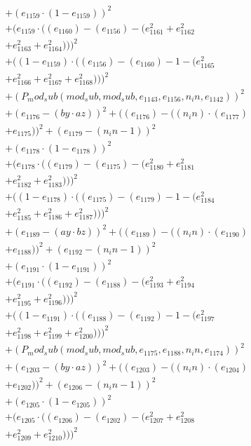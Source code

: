 \documentclass[10pt, a4paper]{article}
\begin{document}
\begin{small}
\begin{align*}
& + (e_{1159}  \cdot  (1 - e_{1159}))^{2} \\
& + (e_{1159}  \cdot  ((e_{1160}) - (e_{1156}) - (e_{1161}^{2} + e_{1162}^{2} \\
& + e_{1163}^{2} + e_{1164}^{2})))^{2} \\
& + ((1 - e_{1159})  \cdot  ((e_{1156}) - (e_{1160}) - 1 - (e_{1165}^{2} \\
& + e_{1166}^{2} + e_{1167}^{2} + e_{1168}^{2})))^{2} \\
& + (P_mod_sub(mod_sub, mod_sub, e_{1143}, e_{1156}, n_in, e_{1142}))^{2} \\
& + (e_{1176} - (by  \cdot  az))^{2} + ((e_{1176}) - ((n_in)  \cdot  (e_{1177}) \\
& + e_{1175}))^{2} + (e_{1179} - (n_in - 1))^{2} \\
& + (e_{1178}  \cdot  (1 - e_{1178}))^{2} \\
& + (e_{1178}  \cdot  ((e_{1179}) - (e_{1175}) - (e_{1180}^{2} + e_{1181}^{2} \\
& + e_{1182}^{2} + e_{1183}^{2})))^{2} \\
& + ((1 - e_{1178})  \cdot  ((e_{1175}) - (e_{1179}) - 1 - (e_{1184}^{2} \\
& + e_{1185}^{2} + e_{1186}^{2} + e_{1187}^{2})))^{2} \\
& + (e_{1189} - (ay  \cdot  bz))^{2} + ((e_{1189}) - ((n_in)  \cdot  (e_{1190}) \\
& + e_{1188}))^{2} + (e_{1192} - (n_in - 1))^{2} \\
& + (e_{1191}  \cdot  (1 - e_{1191}))^{2} \\
& + (e_{1191}  \cdot  ((e_{1192}) - (e_{1188}) - (e_{1193}^{2} + e_{1194}^{2} \\
& + e_{1195}^{2} + e_{1196}^{2})))^{2} \\
& + ((1 - e_{1191})  \cdot  ((e_{1188}) - (e_{1192}) - 1 - (e_{1197}^{2} \\
& + e_{1198}^{2} + e_{1199}^{2} + e_{1200}^{2})))^{2} \\
& + (P_mod_sub(mod_sub, mod_sub, e_{1175}, e_{1188}, n_in, e_{1174}))^{2} \\
& + (e_{1203} - (by  \cdot  az))^{2} + ((e_{1203}) - ((n_in)  \cdot  (e_{1204}) \\
& + e_{1202}))^{2} + (e_{1206} - (n_in - 1))^{2} \\
& + (e_{1205}  \cdot  (1 - e_{1205}))^{2} \\
& + (e_{1205}  \cdot  ((e_{1206}) - (e_{1202}) - (e_{1207}^{2} + e_{1208}^{2} \\
& + e_{1209}^{2} + e_{1210}^{2})))^{2} \\

\end{align*}
\end{small}
\end{document}

